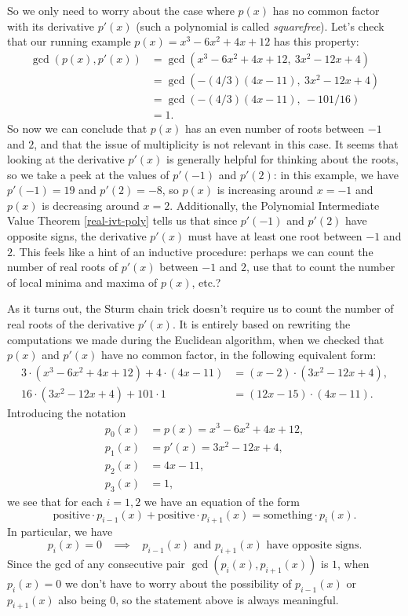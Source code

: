 So we only need to worry about the case where $p(x)$ has no common factor with its derivative $p'(x)$ (such a polynomial is called \emph{squarefree}). Let's check that our running example $p(x) = x^3 - 6x^2 + 4x + 12$ has this property:
\begin{align*}
\gcd(p(x), p'(x)) &= \gcd(x^3 - 6x^2 + 4x + 12,\ 3x^2 - 12x + 4)\\
&= \gcd(-(4/3)(4x - 11),\ 3x^2 - 12x + 4)\\
&= \gcd(-(4/3)(4x - 11),\ -101/16)\\
&= 1.
\end{align*}
So now we can conclude that $p(x)$ has an even number of roots between $-1$ and $2$, and that the issue of multiplicity is not relevant in this case. It seems that looking at the derivative $p'(x)$ is generally helpful for thinking about the roots, so we take a peek at the values of $p'(-1)$ and $p'(2)$: in this example, we have $p'(-1) = 19$ and $p'(2) = -8$, so $p(x)$ is increasing around $x = -1$ and $p(x)$ is decreasing around $x = 2$. Additionally, the Polynomial Intermediate Value Theorem \ref{real-ivt-poly} tells us that since $p'(-1)$ and $p'(2)$ have opposite signs, the derivative $p'(x)$ must have at least one root between $-1$ and $2$. This feels like a hint of an inductive procedure: perhaps we can count the number of real roots of $p'(x)$ between $-1$ and $2$, use that to count the number of local minima and maxima of $p(x)$, etc.?

As it turns out, the Sturm chain trick doesn't require us to count the number of real roots of the derivative $p'(x)$. It is entirely based on rewriting the computations we made during the Euclidean algorithm, when we checked that $p(x)$ and $p'(x)$ have no common factor, in the following equivalent form:
\begin{align*}
3\cdot(x^3 - 6x^2 + 4x + 12) + 4\cdot(4x-11) &= (x-2)\cdot(3x^2 - 12x + 4),\\
16\cdot(3x^2 - 12x + 4) + 101\cdot 1 &= (12x-15)\cdot(4x-11).
\end{align*}
Introducing the notation
\begin{align*}
p_0(x) &= p(x) = x^3 - 6x^2 + 4x + 12,\\
p_1(x) &= p'(x) = 3x^2 - 12x + 4,\\
p_2(x) &= 4x - 11,\\
p_3(x) &= 1,
\end{align*}
we see that for each $i = 1,2$ we have an equation of the form
\[
\text{positive}\cdot p_{i-1}(x) + \text{positive}\cdot p_{i+1}(x) = \text{something}\cdot p_i(x).
\]
In particular, we have
\[
p_i(x) = 0 \;\;\; \implies \;\;\; p_{i-1}(x) \text{ and } p_{i+1}(x) \text{ have opposite signs.}
\]
Since the gcd of any consecutive pair $\gcd(p_i(x), p_{i+1}(x))$ is $1$, when $p_i(x) = 0$ we don't have to worry about the possibility of $p_{i-1}(x)$ or $p_{i+1}(x)$ also being $0$, so the statement above is always meaningful.

